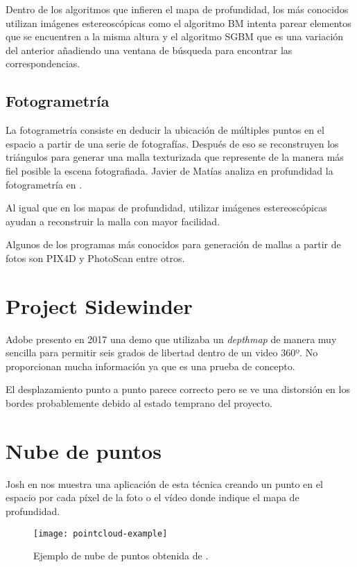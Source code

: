 Dentro de los algoritmos que infieren el mapa de profundidad, los más conocidos utilizan imágenes estereoscópicas como el algoritmo BM  intenta parear elementos que se encuentren a la misma altura y el algoritmo SGBM que es una variación del anterior añadiendo una ventana de búsqueda para encontrar las correspondencias.

\subsection{Fotogrametría}
La fotogrametría consiste en deducir la ubicación de múltiples puntos en el espacio a partir de una serie de fotografías. Después de eso se reconstruyen los triángulos para generar una malla texturizada que represente de la manera más fiel posible la escena fotografiada. Javier de Matías analiza en profundidad la fotogrametría en \cite{PhotogrametryThesis}.

Al igual que en los mapas de profundidad, utilizar imágenes estereoscópicas ayudan a reconstruir la malla con mayor facilidad.

Algunos de los programas más conocidos para generación de mallas a partir de fotos son PIX4D y PhotoScan entre otros.


\section{Project Sidewinder}
Adobe presento en 2017 \cite{SidewinderAdobe} una demo que utilizaba un \textit{depthmap} de manera muy sencilla para permitir seis grados de libertad dentro de un video 360º. No proporcionan mucha información ya que es una prueba de concepto.

El desplazamiento punto a punto parece correcto pero se ve una distorsión en los bordes probablemente debido al estado temprano del proyecto.

\section{Nube de puntos}
Josh en \cite{Josh6DoFUnity} nos muestra una aplicación de esta técnica creando un punto en el espacio por cada píxel de la foto o el vídeo donde indique el mapa de profundidad.

\begin{figure}[H]
  \centering
  \texttt{[image: pointcloud-example]}
  \caption{Ejemplo de nube de puntos obtenida de \cite{Josh6DoFUnity}.}
  \label{fig:pointcloud-example}
\end{figure}
\FloatBarrier

